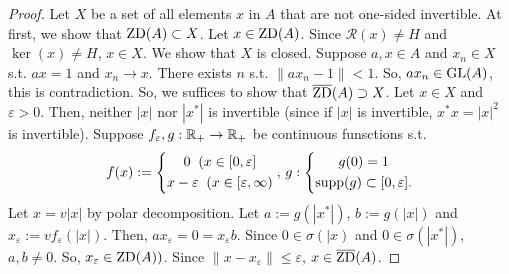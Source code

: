 \begin{proof}
  Let $X$ be a set of all  elements $x$ in $A$ that are not one-sided invertible.
  At first, we show that ${\rm ZD}(A) \subset X$.
  Let $x \in {\rm ZD}(A)$.
  Since $\mathcal{R}(x) \neq H$ and $\ker(x) \neq H$, $x \in X$.
  We show that $X$ is closed.
  Suppose $a, x \in A$ and $x_n \in X$ s.t. $ax=1$ and $x_n \rightarrow x$.
  There exists $n$ s.t. $\|ax_n -1\| < 1$.
  So, $ax_n \in {\rm GL}(A)$, this is contradiction.
  So, we suffices to show that $\overline{{\rm ZD}}(A) \supset X$. Let $x \in X$ and $\varepsilon > 0$.
  Then, neither $|x|$ nor $|x^*|$ is invertible
  (since if $|x|$ is invertible, $x^*x = |x|^2$ is invertible).
  Suppose $f_\varepsilon ,g : \mathbb{R}_+ \rightarrow \mathbb{R}_+$ be continuous funsctions s.t.
  \begin{align*}
    f(x) := \left\{\begin{gathered} 0\;\;  (x \in [0,\varepsilon]\\
    x-\varepsilon\;\; (x \in [\varepsilon, \infty) \end{gathered} \right.,\,
    g:\left\{\begin{gathered} g(0) = 1\\
    {\rm supp}(g) \subset [0,\varepsilon]. \end{gathered} \right.
  \end{align*}
  Let $x = v|x|$ by polar decomposition.
  Let $a := g(|x^*|)$, $b := g(|x|)$ and $x_\varepsilon := v f_\varepsilon (|x|)$.
  Then, $ax_\varepsilon = 0 = x_\varepsilon b$.
  Since $0 \in \sigma(|x)$ and $0 \in \sigma(|x^*|)$,
  $a,b \neq 0$.
  So, $x_\varepsilon \in {\rm ZD}(A))$.
  Since $\|x - x_\varepsilon\| \leq \varepsilon$, $x \in \overline{{\rm ZD}}(A)$.
\end{proof}
